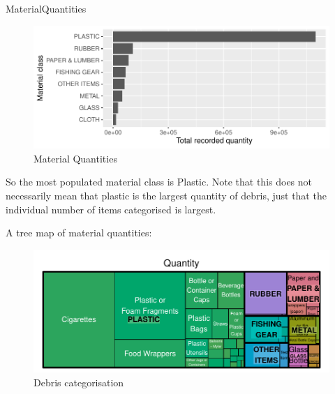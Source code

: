 \documentclass[10pt]{article}\usepackage[]{graphicx}\usepackage[]{color}
\newenvironment{knitrout}{}{} %
\begin{document}
MaterialQuantities\\

\begin{figure}[H] %
\begin{center}
\begin{knitrout}\small
{}\color{fgcolor}
\includegraphics[width=1\linewidth]{figure/unnamed-chunk-12-1} 

\end{knitrout}
\caption {Material Quantities}
\label{figC}
\end {center}
\end {figure}

So the most populated material class is Plastic. Note that this does not necessarily mean that plastic is the largest quantity of debris, just that the individual number of items categorised is largest.

A tree map of material quantities:
\begin{figure}[H] %
\begin{center}
\begin{knitrout}\small
{}\color{fgcolor}
\includegraphics[width=1\linewidth]{figure/unnamed-chunk-13-1} 

\end{knitrout}
\caption {Debris categorisation}
\label{figI}
\end {center}
\end {figure}
\end{document}
